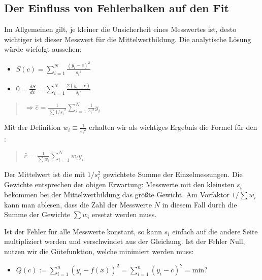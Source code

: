 \documentclass[letterpaper,10pt,english]{jupyterBook}
\begin{document}
\subsection{Der Einfluss von Fehlerbalken auf den Fit }
\label{\detokenize{content/T_FitmitFehlerbalken:der-einfluss-von-fehlerbalken-auf-den-fit-a-id-subsec-ausprobieren-a}}
\sphinxAtStartPar
Im Allgemeinen gilt, je kleiner die Unsicherheit eines Messwertes ist, desto wichtiger ist dieser Messwert für die Mittelwertbildung. Die analytische Lösung würde wiefolgt aussehen:
\begin{itemize}
\item {} 
\sphinxAtStartPar
\(S(c) = \displaystyle\sum_{i=1}^{N} \frac{(y_i -c)^2}{{s_i}^2}\)

\item {} 
\sphinxAtStartPar
\(0= \frac{dS}{dc} = \displaystyle\sum_{i=1}^{N} \frac{2 (y_i -c)}{{s_i}^2}\)

\end{itemize}
\begin{quote}

\sphinxAtStartPar
\(\Rightarrow {\hat c} = \frac{1}{\sum{1/s_i}^2}
     \displaystyle\sum_{i=1}^{N}\frac{1}{{s_i}^2}y_i \)
\end{quote}

\sphinxAtStartPar
Mit der Definition \( w_i \equiv \frac{1} {{s_i}^2}\) erhalten wir als wichtiges
Ergebnis die Formel für den :
\begin{quote}

\sphinxAtStartPar
\({\hat c}= \frac{1} {\sum {w_i}} \displaystyle\sum_{i=1}^{N}  {w_i} y_i\)
\end{quote}

\sphinxAtStartPar
Der Mittelwert ist die mit \(1/s_i^2\) gewichtete Summe der Einzelmessungen.
Die Gewichte entsprechen der obigen Erwartung: Messwerte mit den kleinsten \(s_i\)
bekommen bei der Mittelwertbildung das größte Gewicht. Am Vorfaktor \(1/\sum w_i\) kann
man ablesen, dass die Zahl der Messwerte \(N\) in diesem Fall durch die Summe der Gewichte
\(\sum w_i\) ersetzt werden muss.

\sphinxAtStartPar
Ist der Fehler für alle Messwerte konstant, so kann \(s_i\) einfach auf die andere Seite multipliziert werden und verschwindet aus der Gleichung. Ist der Fehler Null, nutzen wir die Gütefunktion, welche minimiert werden muss:
\begin{itemize}
\item {} 
\sphinxAtStartPar
\(Q(c) := \sum_{i=1}^n (y_i - f(x))^2 = \sum_{i=1}^n (y_i - c)^2 = \textrm{min?}\)

\end{itemize}
\end{document}
